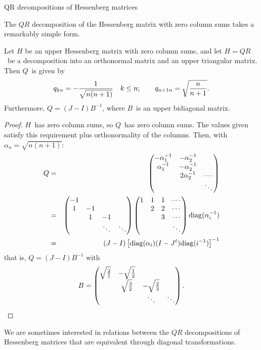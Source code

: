  {QR decompositions of Hessenberg matrices}
\FurtherReading

The $QR$ decomposition of the Hessenberg matrix with
zero column sums takes a remarkably simple form.

\begin{lemma}\label{H:QR:zero-colsum}
Let $H$ be an upper Hessenberg matrix with zero column sums, and let
$H=QR$~be a decomposition into an orthonormal matrix and an upper
triangular matrix. Then $Q$~is given by
\[ q_{kn}=-{1\over\sqrt{n(n+1)}}\quad k\leq n;\qquad
        q_{n+1n}=\sqrt{n\over n+1}. \]
Furthermore, $Q=(J-I)B^{-1}$, where $B$~is an upper bidiagonal matrix.
\end{lemma}
\begin{proof} $H$~has zero column sums, so $Q$~has zero column sums.
The values given satisfy this requirement plus orthonormality
of the columns. Then, with $\alpha_n=\sqrt{n(n+1)}$:
\begin{eqnarray*}
 Q&=&\begin{pmatrix}-\alpha_1^{-1}&-\alpha_2^{-1}\cr
                \alpha_1^{-1}&-\alpha_2^{-1}\cr
                &2\alpha_2^{-1}&\cdots\cr &&\ddots\cr\end{pmatrix}\\
 &=&\begin{pmatrix}-1\cr 1&-1\cr &1&-1\cr &&\ddots&\ddots\end{pmatrix}
        \begin{pmatrix}1&1&1&\cdots\cr &2&2&\cdots\cr &&3&\cdots\cr &&&\ddots\cr\end{pmatrix}
        {\rm diag}(\alpha_i^{-1})\\
 &=&(J-I)\left[{\rm diag}(\alpha_i)(I-J^t){\rm diag}(i^{-1})\right]^{-1}
        \end{eqnarray*}
that is, $Q=(J-I)B^{-1}$ with
\[ B = \begin{pmatrix}\sqrt{2\over 1}&-\sqrt{1\over 2}\cr
                &\sqrt{3\over 2}&-\sqrt{2\over 3}\cr
                &&\ddots&\ddots\cr\end{pmatrix}. \]
\end{proof}


We are sometimes interested in relations between the $QR$ decompositions
of Hessenberg matrices that are equivalent through diagonal
transformations.

